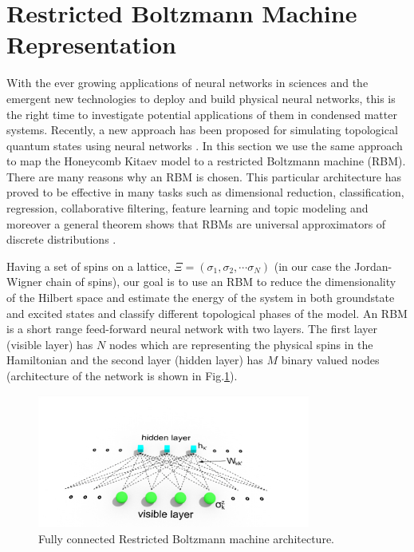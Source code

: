 \documentclass{article}
\begin{document}
\section{Restricted Boltzmann Machine Representation}\label{sec3}

With the ever growing applications of neural networks in sciences and the emergent new technologies to deploy and build physical neural networks, this is the right time to investigate potential applications of them in condensed matter systems. Recently, a new approach has been proposed for simulating topological quantum states using neural networks \cite{Deng_2017}. In this section we use the same approach to map the Honeycomb Kitaev model to a restricted Boltzmann machine (RBM). There are many reasons why an RBM is chosen. This particular architecture has proved to be effective in many tasks such as dimensional reduction, classification, regression, collaborative filtering, feature learning and topic modeling and moreover a general theorem shows that RBMs are universal approximators of discrete distributions \cite{LeRouxBengio}.

Having a set of spins on a lattice, $\Xi=(\sigma_{1},\sigma_{2},\cdots\sigma_{N})$ (in our case the Jordan-Wigner chain of spins), our goal is to use an RBM to reduce the dimensionality of the Hilbert space and estimate the energy of the system in both groundstate and excited states and classify different topological phases of the model. An RBM is a short range feed-forward neural network with two layers. The first layer (visible layer) has $N$ nodes which are representing the physical spins in the Hamiltonian and the second layer (hidden layer) has $M$ binary valued nodes (architecture of the network is shown in Fig.\ref{rbm-arc}). 

\begin{figure}[!htb]
	\centering
	\includegraphics[width=0.8\textwidth]{./images/rbm}
	\caption{\label{rbm-arc} Fully connected Restricted Boltzmann machine architecture.}
\end{figure}
\end{document}
